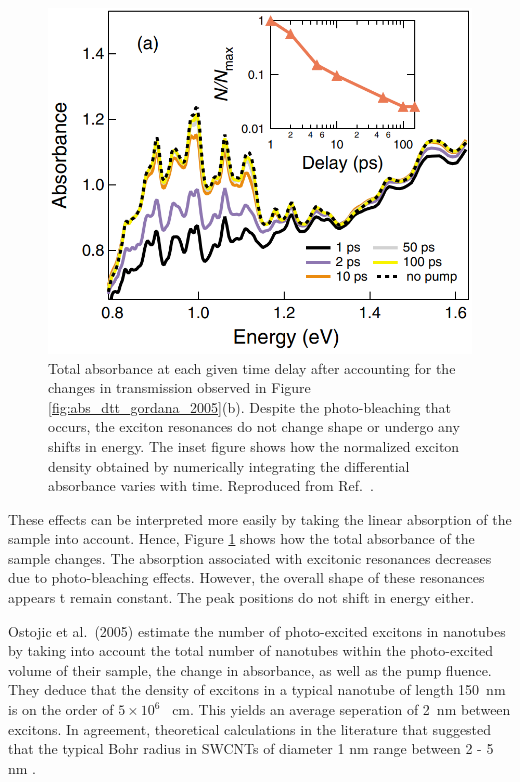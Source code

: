 \begin{figure}[ht]
	\centering
	\includegraphics[scale=1.2]{images/chapter_prior_works/total_abs_gordana_2005}
	\caption{Total absorbance at each given time delay after accounting for the changes in transmission observed in Figure \ref{fig:abs_dtt_gordana_2005}(b). Despite the photo-bleaching that occurs, the exciton resonances do not change shape or undergo any shifts in energy. The inset figure shows how the normalized exciton density obtained by numerically integrating the differential absorbance varies with time. Reproduced from Ref.\ \cite{ostojic2005stability}.}
	\label{fig:total_abs_gordana_2005}
\end{figure}


These effects can be interpreted more easily by taking the linear absorption of the sample into account. Hence, Figure \ref{fig:total_abs_gordana_2005} shows how the total absorbance of the sample changes. The absorption associated with excitonic resonances decreases due to photo-bleaching effects. However, the overall shape of these resonances appears t remain constant. The peak positions do not shift in energy either.

Ostojic et al.\ (2005) estimate the number of photo-excited excitons in nanotubes by taking into account the total number of nanotubes within the photo-excited volume of their sample, the change in absorbance, as well as the pump fluence. They deduce that the density of excitons in a typical nanotube of length \SI{150}{\nm} is on the order of $5 \times 10^6$ \si{\per\cm}. This yields an average seperation of \SI{2}{\nm} between excitons. In agreement, theoretical calculations in the literature that suggested that the typical Bohr radius in SWCNTs of diameter 1 nm range between 2 - 5 \si{\nm} \cite{spataru2004excitonic, chang2004excitons}.

